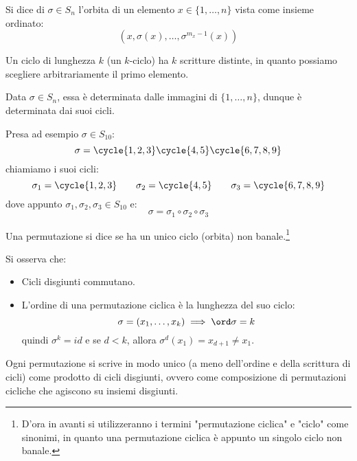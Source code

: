 \documentclass[11pt]{scrartcl}
\begin{document}
\begin{definition}
    Si dice  di $\sigma \in S_n$ l'orbita di un elemento $x \in \{1,\ldots,n\}$ vista come insieme ordinato:
        \[ (x,\sigma(x),\ldots,\sigma^{m_x-1}(x))
            \]
\end{definition}

\begin{remark}
    Un ciclo di lunghezza $k$ (un $k$-ciclo) ha $k$ scritture distinte, in quanto possiamo scegliere arbitrariamente il primo elemento.
\end{remark}

\begin{remark}
    Data $\sigma \in S_n$, essa è determinata dalle immagini di $\{1,\ldots,n\}$, dunque è determinata dai suoi cicli.
\end{remark}

\begin{example}
    Presa ad esempio $\sigma \in S_{10}$:
        \[ \sigma = \cycle{1,2,3}\cycle{4,5}\cycle{6,7,8,9}
            \]
    chiamiamo i suoi cicli:
        \[ \sigma_1 = \cycle{1,2,3} \qquad \sigma_2 = \cycle{4,5} \qquad \sigma_3 = \cycle{6,7,8,9}
            \]
    dove appunto $\sigma_1,\sigma_2,\sigma_3 \in S_{10}$ e:
        \[ \sigma = \sigma_1 \circ \sigma_2 \circ \sigma_3
            \]
\end{example}

\begin{definition}
    Una permutazione si dice  se ha un unico ciclo (orbita) non banale.\footnote{D'ora in avanti si utilizzeranno i termini "permutazione ciclica" e "ciclo" come sinonimi, in quanto una permutazione ciclica è appunto un singolo ciclo non banale.}
\end{definition}

\begin{remark}
    Si osserva che:
        \begin{itemize}
            \item Cicli disgiunti commutano.
            \item L'ordine di una permutazione ciclica è la lunghezza del suo ciclo:
                    \[ \sigma = (x_1,\ldots,x_k) \implies \ord \sigma = k
                        \]
                quindi $\sigma^k = id$ e se $d < k$, allora $\sigma^d(x_1) = x_{d+1} \ne x_1$.
        \end{itemize}
\end{remark}

\begin{proposition}
    \label{perm}
    Ogni permutazione si scrive in modo unico (a meno dell'ordine e della scrittura di cicli) come prodotto di cicli disgiunti,
     ovvero come composizione di permutazioni cicliche che agiscono su insiemi disgiunti.
\end{proposition}
\end{document}
